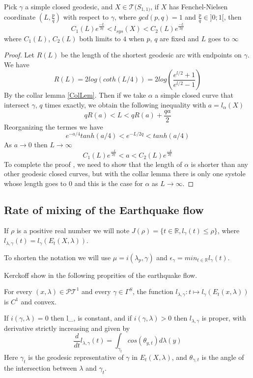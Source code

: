 \begin{lem}
Pick $\gamma$ a simple closed geodesic, and $X \in \mathcal{T}(S_{1,1)}$, if $X$ has Fenchel-Nielsen coordinate $(L,\frac{p}{q})$ with respect to $\gamma$, where $gcd(p,q)=1$ and $\frac{p}{q} \in ]0;1[$, then \[
C_1(L) e^{\frac{-L}{2q}} < l_{sys}(X) < C_2(L) e^{\frac{-L}{2q}}
\]
where $C_1(L)$, $C_2(L)$ both limits to $4$ when $p$, $q$ are fixed and $L$ goes to $\infty$
\end{lem}

\begin{proof}
Let $R(L)$ be the length of the shortest geodesic arc with endpoints on $\gamma$. We have \[
R(L)= 2 log(coth(L/4))=2 log(\frac{e^{l/2}+1}{e^{l/2}-1})
\]
By the collar lemma \ref{ColLem}.
Then if we take $\alpha$ a simple closed curve that intersect $\gamma$, $q$ times exactly, we obtain the following inequality with $a=l_\alpha(X)$ \[
q R(a) < L < q R(a) + \frac{qa}{2}
\]
Reorganizing the termes we have \[
e^{-a/4}tanh(a/4) < e^{-L/2q} < tanh(a/4)
\]
As $a \rightarrow 0$ then $L \rightarrow \infty$
\[
C_1(L) e^{\frac{-L}{2q}} < a < C_2(L) e^{\frac{-L}{2q}}
\]
To complete the proof , we need to show that the length of $\alpha$ is shorter than any other geodesic closed curves, but with the collar lemma there is only one systole whose length goes to $0$ and this is the case for $\alpha$ as $L \rightarrow \infty$.

\end{proof}

\subsection{Rate of mixing of the Earthquake flow}

If $\rho$ is a positive real number we will note $J(\rho)= \{t \in \mathbb{R} , l_\gamma(t) \leq \rho \}$, where $l_{\lambda,\gamma}(t)=l_{\gamma}(E_t(X,\lambda))$.

To shorten the notation we will use $\mu=i(\lambda_p,\gamma)$ and $\epsilon_\gamma = min_{t \in \mathbb{R}} l_\gamma (t)$.


Kerckoff show in \cite{NielsenRealizationPr} the following proprities of the earthquake flow.

\begin{prop}
For every $(x,\lambda) \in \mathcal{PT}^1$ and every $\gamma \in \Gamma^S$, the function $l_{\lambda,\gamma}: t \mapsto l_\gamma(E_t(x,\lambda))$ is $C^1$ and convex.

If $i(\gamma,\lambda)=0$ then l_{\lambda,\gamma} is constant, and if $i(\gamma,\lambda)>0$ then $l_{\lambda,\gamma}$ is proper, with derivative strictly increasing and given by \begin{equation}
\frac{d}{dt}l_{\lambda,\gamma}(t)= \int_{\gamma_t}cos(\theta_{y,t})d \lambda(y)
\end{equation}
Here $\gamma_t$ is the geodesic representative of $\gamma$ in $E_t(X,\lambda)$, and $\theta_{\gamma,t}$ is the angle of the intersection between $\lambda$ and $\gamma_t$.
\end{prop}

